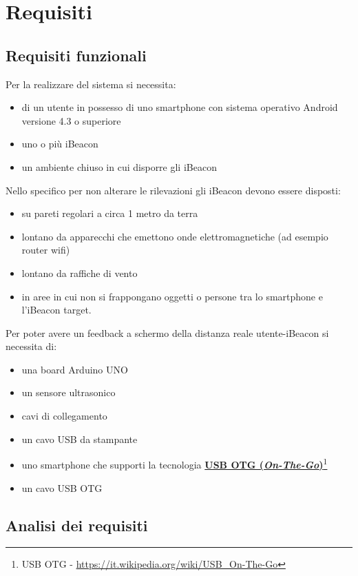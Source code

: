 \chapter{Requisiti}

\section{Requisiti funzionali}
Per la realizzare del sistema si necessita:
\begin{itemize}
	\item di un utente in possesso di uno smartphone con sistema operativo Android versione 4.3 o superiore
	\item uno o più iBeacon 
	\item un ambiente chiuso in cui disporre gli iBeacon
\end{itemize}
Nello specifico per non alterare le rilevazioni gli iBeacon devono essere disposti:
\begin{itemize}
	\item su pareti regolari a circa 1 metro da terra
	\item lontano da apparecchi che emettono onde elettromagnetiche (ad esempio router wifi) 
	\item lontano da raffiche di vento
	\item in aree in cui non si frappongano oggetti o persone tra lo smartphone e l'iBeacon target.
\end{itemize}
Per poter avere un feedback a schermo della distanza reale utente-iBeacon si necessita di:
\begin{itemize}
	\item una board Arduino UNO
	\item un sensore ultrasonico
	\item cavi di collegamento
	\item un cavo USB da stampante
	\item uno smartphone che supporti la tecnologia 
	\href{https://it.wikipedia.org/wiki/USB_On-The-Go}{\textbf{USB OTG (\textit{On-The-Go})}}\footnote{USB OTG - \url{https://it.wikipedia.org/wiki/USB_On-The-Go}}
	\item un cavo USB OTG
\end{itemize}


\section{Analisi dei requisiti}

